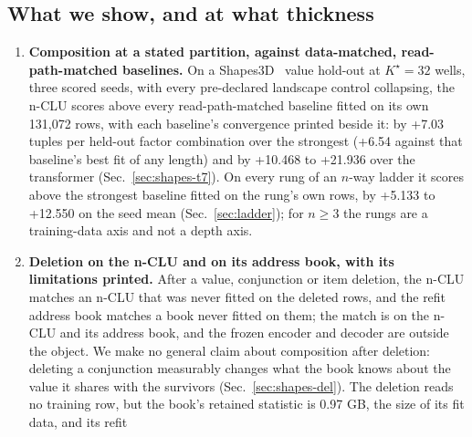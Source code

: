 \documentclass{article} %
\newcommand{\Kstar}{\ensuremath{K^{\star}}}
\begin{document}
\subsection{What we show, and at what thickness}
\label{sec:contrib}

\begin{enumerate}
\item \textbf{Composition at a stated partition, against data-matched, read-path-matched baselines.} On a
  Shapes3D~\citep{burgess2018shapes,kim2018disentangling} value hold-out at $\Kstar=32$ wells, three scored seeds, with every %
  pre-declared landscape control collapsing, the n-CLU scores above every read-path-matched baseline
  fitted on its own 131,072 rows, with each baseline's convergence printed beside it: by +7.03 tuples %
  per held-out factor combination over the strongest (+6.54 against that baseline's best fit of any length) and by +10.468 %
  to +21.936 over the transformer (Sec.~\ref{sec:shapes-t7}). On every rung of an $n$-way ladder it %
  scores above the strongest baseline fitted on the rung's own rows, by +5.133 to +12.550 on the seed %
  mean (Sec.~\ref{sec:ladder}); for $n\ge3$ the rungs are a training-data axis and not a depth axis.
\item \textbf{Deletion on the n-CLU and on its address book, with its limitations printed.} After
  a value, conjunction or item deletion, the n-CLU matches an n-CLU that was never fitted on the deleted
  rows, and the refit address book matches a book never fitted on them; the match is on the n-CLU and
  its address book, and the frozen encoder and decoder are outside the object. We make no general claim
  about composition after deletion: deleting a conjunction measurably changes what the book knows %
  about the value it shares with the survivors (Sec.~\ref{sec:shapes-del}). The deletion reads no
  training row, but the book's retained statistic is 0.97 GB, the size of its fit data, and its refit %

\end{enumerate}
\end{document}
